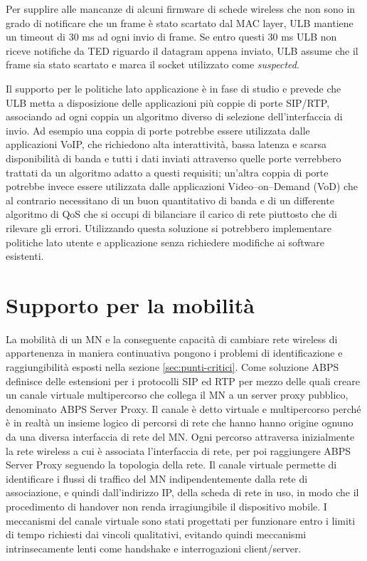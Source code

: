 \documentclass[12pt,a4paper,openright,twoside]{book}
\begin{document}
Per supplire alle mancanze di alcuni firmware di schede wireless che
non sono in grado di notificare che un frame è stato scartato dal MAC
layer, ULB mantiene un timeout di 30 ms ad ogni invio di frame. Se
entro questi 30 ms ULB non riceve notifiche da TED riguardo il
datagram appena inviato, ULB assume che il frame sia stato scartato e
marca il socket utilizzato come \emph{suspected}.

Il supporto per le politiche lato applicazione è in fase di studio e
prevede che ULB metta a disposizione delle applicazioni più coppie di
porte SIP/RTP, associando ad ogni coppia un algoritmo diverso di
selezione dell'interfaccia di invio. Ad esempio una coppia di porte
potrebbe essere utilizzata dalle applicazioni VoIP, che richiedono
alta interattività, bassa latenza e scarsa disponibilità di banda e
tutti i dati inviati attraverso quelle porte verrebbero trattati da un
algoritmo adatto a questi requisiti; un'altra coppia di porte potrebbe
invece essere utilizzata dalle applicazioni Video--on--Demand (VoD)
che al contrario necessitano di un buon quantitativo di banda e di un
differente algoritmo di QoS che si occupi di bilanciare il carico di
rete piuttosto che di rilevare gli errori. Utilizzando questa
soluzione si potrebbero implementare politiche lato utente e
applicazione senza richiedere modifiche ai software esistenti.

\section{Supporto per la mobilità}

La mobilità di un MN e la conseguente capacità di cambiare rete
wireless di appartenenza in maniera continuativa pongono i problemi di
identificazione e raggiungibilità esposti nella sezione
\ref{sec:punti-critici}. Come soluzione ABPS definisce delle
estensioni per i protocolli SIP ed RTP per mezzo delle quali creare un
canale virtuale multipercorso che collega il MN a un server proxy
pubblico, denominato ABPS Server Proxy. Il canale è detto virtuale e
multipercorso perché è in realtà un insieme logico di percorsi di rete
che hanno hanno origine ognuno da una diversa interfaccia di rete del
MN. Ogni percorso attraversa inizialmente la rete wireless a cui è
associata l'interfaccia di rete, per poi raggiungere ABPS Server Proxy
seguendo la topologia della rete. Il canale virtuale permette di
identificare i flussi di traffico del MN indipendentemente dalla rete
di associazione, e quindi dall'indirizzo IP, della scheda di rete in
uso, in modo che il procedimento di handover non renda irragiungibile
il dispositivo mobile. I meccanismi del canale virtuale sono stati
progettati per funzionare entro i limiti di tempo richiesti dai
vincoli qualitativi, evitando quindi meccanismi intrinsecamente lenti
come handshake e interrogazioni client/server.
\end{document}
